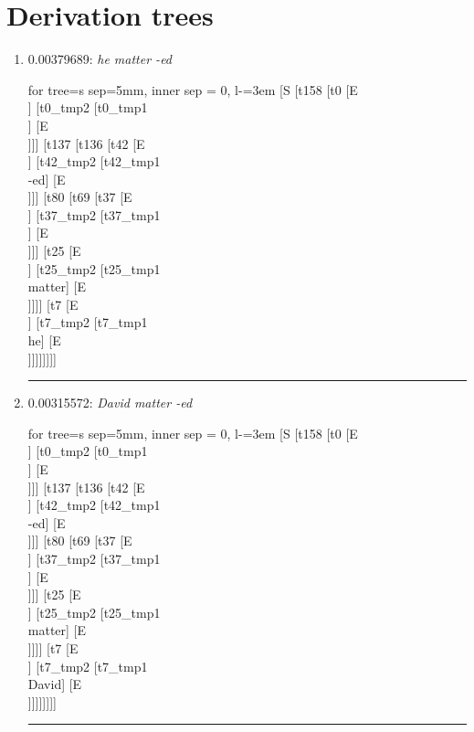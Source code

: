 \documentclass[11pt]{article}
\begin{document}
\section{Derivation trees}
\begin{enumerate}
	\item  0.00379689: \textit{he matter -ed} \\[0.5em]
	\begin{forest}
	for tree={s sep=5mm, inner sep = 0, l-=3em}
	[S [t158 [t0 [E\\ ] [t0_tmp2 [t0_tmp1\\ ] [E\\ ]]] [t137 [t136 [t42 [E\\ ] [t42_tmp2 [t42_tmp1\\-ed] [E\\ ]]] [t80 [t69 [t37 [E\\ ] [t37_tmp2 [t37_tmp1\\ ] [E\\ ]]] [t25 [E\\ ] [t25_tmp2 [t25_tmp1\\matter] [E\\ ]]]] [t7 [E\\ ] [t7_tmp2 [t7_tmp1\\he] [E\\ ]]]]]]]]
	\end{forest}
	\vspace{2\baselineskip}
	\hrule

	\item  0.00315572: \textit{David matter -ed} \\[0.5em]
	\begin{forest}
	for tree={s sep=5mm, inner sep = 0, l-=3em}
	[S [t158 [t0 [E\\ ] [t0_tmp2 [t0_tmp1\\ ] [E\\ ]]] [t137 [t136 [t42 [E\\ ] [t42_tmp2 [t42_tmp1\\-ed] [E\\ ]]] [t80 [t69 [t37 [E\\ ] [t37_tmp2 [t37_tmp1\\ ] [E\\ ]]] [t25 [E\\ ] [t25_tmp2 [t25_tmp1\\matter] [E\\ ]]]] [t7 [E\\ ] [t7_tmp2 [t7_tmp1\\David] [E\\ ]]]]]]]]
	\end{forest}
	\vspace{2\baselineskip}
	\hrule


\end{enumerate}
\end{document}
